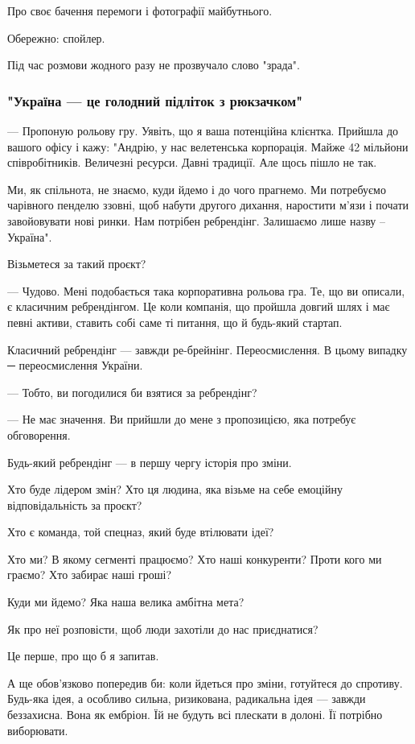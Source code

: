 Про своє бачення перемоги і фотографії майбутнього.

Обережно: спойлер. 

Під час розмови жодного разу не прозвучало слово "зрада". 

\subsubsection{"Україна --- це голодний підліток з рюкзачком"}

--- Пропоную рольову гру. Уявіть, що я ваша потенційна клієнтка. Прийшла до
вашого офісу і кажу: "Андрію, у нас велетенська корпорація. Майже 42 мільйони
співробітників. Величезні ресурси. Давні традиції. Але щось пішло не так.

Ми, як спільнота, не знаємо, куди йдемо і до чого прагнемо. Ми потребуємо
чарівного пенделю ззовні, щоб набути другого дихання, наростити м’язи і почати
завойовувати нові ринки. Нам потрібен ребрендінг. Залишаємо лише назву –
Україна".

Візьметеся за такий проєкт?

--- Чудово. Мені подобається така корпоративна рольова гра. Те, що ви описали, є
класичним ребрендінгом. Це коли компанія, що пройшла довгий шлях і має певні
активи, ставить собі саме ті питання, що й будь-який стартап.

Класичний ребрендінг --- завжди ре-брейнінг. Переосмислення. В цьому випадку ─
переосмислення України.

--- Тобто, ви погодилися би взятися за ребрендінг?

--- Не має значення. Ви прийшли до мене з пропозицією, яка потребує обговорення.

Будь-який ребрендінг --- в першу чергу історія про зміни.

Хто буде лідером змін? Хто ця людина, яка візьме на себе емоційну
відповідальність за проєкт?

Хто є команда, той спецназ, який буде втілювати ідеї?

Хто ми? В якому сегменті працюємо? Хто наші конкуренти? Проти кого ми граємо?
Хто забирає наші гроші?

Куди ми йдемо? Яка наша велика амбітна мета?

Як про неї розповісти, щоб люди захотіли до нас приєднатися?

Це перше, про що б я запитав.

А ще обов’язково попередив би: коли йдеться про зміни, готуйтеся до спротиву.
Будь-яка ідея, а особливо сильна, ризикована, радикальна ідея --- завжди
беззахисна. Вона як ембріон. Їй не будуть всі плескати в долоні. Її потрібно
виборювати.

